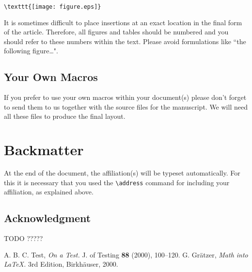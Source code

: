 \documentclass{birkjour}
\theoremstyle{definition}
\theoremstyle{remark}
\numberwithin{equation}{section}
\begin{document}
\begin{verbatim}\texttt{[image: figure.eps]}\end{verbatim}

It is sometimes difficult to place insertions at an exact location
in the final form of the article. Therefore, all figures and tables
should be numbered and you should refer to these numbers within
the text. Please avoid formulations like ``the following
figure\dots".

\subsection{Your Own Macros}

If you prefer to use your own macros within your document(s)
please don't forget to send them to us together with the source
files for the manuscript. We will need all these files to produce
the final layout.


\section{Backmatter}

At the end of the document, the affiliation(s) will be typeset
automatically. For this it is necessary that you used the \verb+\address+ command for including your affiliation, as explained above.



\subsection*{Acknowledgment}
TODO ?????


\begin{thebibliography}{1}
 A. B. C. Test, \textit{On a Test.} J. of Testing
\textbf{88} (2000), 100--120.
 G. Gr\"atzer, \textit{Math into \LaTeX.} 3rd Edition,
Birkh\"auser, 2000.
\end{thebibliography}

\end{document}
